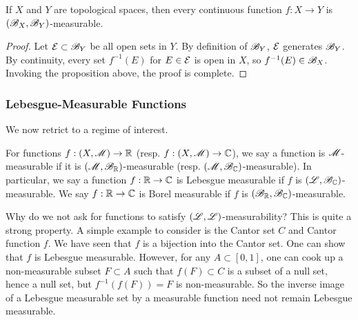 \documentclass[12pt]{article} %
\begin{document}
\begin{corollary}
    If $X$ and $Y$ are topological spaces, then every continuous function $f : X \to Y$ is $(\mathscr{B}_X, \mathscr{B}_Y)$-measurable.
\end{corollary}

\begin{proof}
    Let $\mathcal{E} \subset \mathscr{B}_Y$ be all open sets in $Y$. By definition of $\mathscr{B}_Y$, $\mathcal{E}$ generates $\mathscr{B}_Y$. By continuity, every set $f^{-1}(E)$ for $E \in \mathcal{E}$ is open in $X$, so $f^{-1}(E) \in \mathscr{B}_X$. Invoking the proposition above, the proof is complete.
\end{proof}

\subsubsection{Lebesgue-Measurable Functions}

We now retrict to a regime of interest.

\begin{definition}
    For functions $f : (X, \mathscr{M}) \to \mathbb{R}$ (resp. $f : (X, \mathscr{M}) \to \mathbb{C}$), we say a function is $\mathscr{M}$-measurable if it is $(\mathscr{M}, \mathscr{B}_{\mathbb{R}})$-measurable (resp. $(\mathscr{M}, \mathscr{B}_{\mathbb{C}})$-measurable). In particular, we say a function $f : \mathbb{R} \to \mathbb{C}$ is Lebesgue measurable if $f$ is $(\mathscr{L}, \mathscr{B}_{\mathbb{C}})$-measurable. We say $f : \mathbb{R} \to \mathbb{C}$ is Borel measurable if $f$ is $(\mathscr{B}_{\mathbb{R}}, \mathscr{B}_{\mathbb{C}})$-measurable.
\end{definition}


\begin{example}
    Why do we not ask for functions to satisfy $(\mathscr{L}, \mathscr{L})$-measurability? This is quite a strong property. A simple example to consider is the Cantor set $C$ and Cantor function $f$. We have seen that $f$ is a bijection into the Cantor set. One can show that $f$ is Lebesgue measurable. However, for any $A \subset [0,1]$, one can cook up a non-measurable subset $F \subset A$ such that $f(F) \subset C$ is a subset of a null set, hence a null set, but $f^{-1}(f(F)) = F$ is non-measurable. So the inverse image of a Lebesgue measurable set by a measurable function need not remain Lebesgue measurable.
\end{example}
\end{document}
